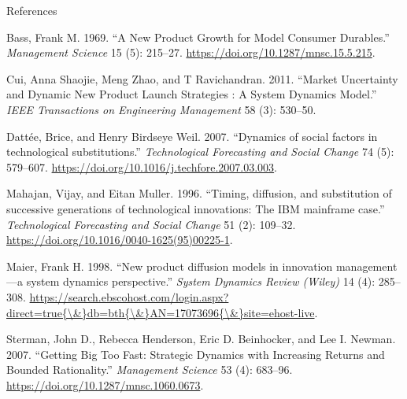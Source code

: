 \documentclass[12pt,ignorenonframetext,]{beamer}
\begin{document}
\begin{frame}[allowframebreaks]{References}
\protect\hypertarget{references}{}

\hypertarget{refs}{}
\leavevmode\hypertarget{ref-Bass1969}{}%
Bass, Frank M. 1969. ``A New Product Growth for Model Consumer
Durables.'' \emph{Management Science} 15 (5): 215--27.
\url{https://doi.org/10.1287/mnsc.15.5.215}.

\leavevmode\hypertarget{ref-Cui2011}{}%
Cui, Anna Shaojie, Meng Zhao, and T Ravichandran. 2011. ``Market
Uncertainty and Dynamic New Product Launch Strategies : A System
Dynamics Model.'' \emph{IEEE Transactions on Engineering Management} 58
(3): 530--50.

\leavevmode\hypertarget{ref-Dattee2007}{}%
Dattée, Brice, and Henry Birdseye Weil. 2007. ``Dynamics of social
factors in technological substitutions.'' \emph{Technological
Forecasting and Social Change} 74 (5): 579--607.
\url{https://doi.org/10.1016/j.techfore.2007.03.003}.

\leavevmode\hypertarget{ref-Mahajan1996}{}%
Mahajan, Vijay, and Eitan Muller. 1996. ``Timing, diffusion, and
substitution of successive generations of technological innovations: The
IBM mainframe case.'' \emph{Technological Forecasting and Social Change}
51 (2): 109--32. \url{https://doi.org/10.1016/0040-1625(95)00225-1}.

\leavevmode\hypertarget{ref-Maier1998}{}%
Maier, Frank H. 1998. ``New product diffusion models in innovation
management---a system dynamics perspective.'' \emph{System Dynamics
Review (Wiley)} 14 (4): 285--308.
\href{https://search.ebscohost.com/login.aspx?direct=true\%7B/\&\%7Ddb=bth\%7B/\&\%7DAN=17073696\%7B/\&\%7Dsite=ehost-live}{https://search.ebscohost.com/login.aspx?direct=true\{\textbackslash{}\&\}db=bth\{\textbackslash{}\&\}AN=17073696\{\textbackslash{}\&\}site=ehost-live}.

\leavevmode\hypertarget{ref-Sterman2007}{}%
Sterman, John D., Rebecca Henderson, Eric D. Beinhocker, and Lee I.
Newman. 2007. ``Getting Big Too Fast: Strategic Dynamics with Increasing
Returns and Bounded Rationality.'' \emph{Management Science} 53 (4):
683--96. \url{https://doi.org/10.1287/mnsc.1060.0673}.

\end{frame}
\end{document}
